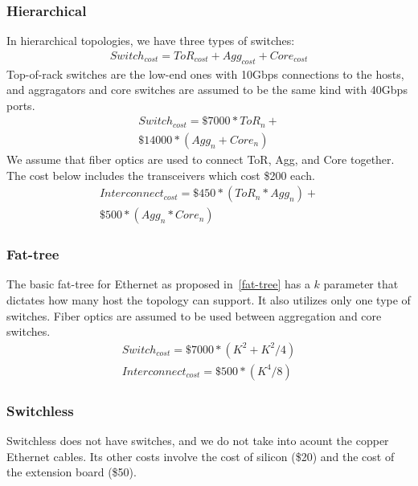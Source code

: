 \subsubsection{Hierarchical}
In hierarchical topologies, we have three types of switches:
\vspace{-0.1in}
\begin{multline}
Switch_{cost} = ToR_{cost} + Agg_{cost} + Core_{cost}
\end{multline}
Top-of-rack switches are the low-end ones with 10Gbps connections to the hosts, and aggragators and core switches are assumed to be the same kind with 40Gbps ports.
\vspace{-0.1in}
\begin{multline}
Switch_{cost} = \$7000 * ToR_n +\\
                \$14000 * (Agg_n + Core_n)
\end{multline}
We assume that fiber optics are used to connect ToR, Agg, and Core together. The cost below includes the transceivers which cost \$200 each.
\vspace{-0.1in}
\begin{multline}
Interconnect_{cost} = \$450 * (ToR_n * Agg_n) +\\
                      \$500 * (Agg_n * Core_n)
\end{multline}
\subsubsection{Fat-tree}
The basic fat-tree for Ethernet as proposed in~\ref{fat-tree} has a $k$ parameter that dictates how many host the topology can support. It also utilizes only one type of switches. Fiber optics are assumed to be used between aggregation and core switches.
\vspace{-0.1in}
\begin{align}
Switch_{cost} = \$7000 * (K^2 + K^2 / 4) \\
Interconnect_{cost} = \$500 * (K^4 / 8)
\end{align}
\subsubsection{Switchless}
Switchless does not have switches, and we do not take into acount the copper Ethernet cables. Its other costs involve the cost of silicon (\$20) and the cost of the extension board (\$50).
